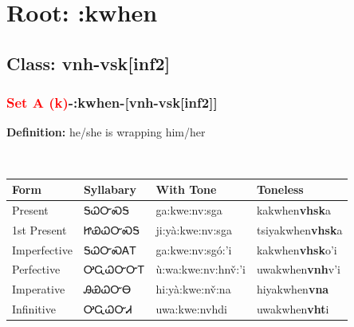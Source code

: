 \needspace{4in}
\section*{Root: :kwhen}
\nopagebreak
{}
\needspace{3in}
\subsection*{Class: vnh-vsk[inf2]}
\nopagebreak
\needspace{2in}
\subsubsection*{\textcolor{Red}{Set A (k)}{-}\textbf{:kwhen}{-}[vnh-vsk[inf2]]}
\nopagebreak
\textbf{Definition: } he/she is wrapping him/her
\\[0.5em]
\begin{tabularx}{\textwidth}{l X X X}%
\toprule%
\textbf{Form}&\textbf{Syllabary}&\textbf{With Tone}&\textbf{Toneless}\\%
\midrule%
Present&ᎦᏇᏅᏍᎦ&ga:kwe:nv:sga&kakwhen\textbf{vhsk}a\\%
1st Present&ᏥᏯᏇᏅᏍᎦ&ji:yà:kwe:nv:sga&tsiyakwhen\textbf{vhsk}a\\%
Imperfective&ᎦᏇᏅᏍᎪᎢ&ga:kwe:nv:sgó:’i&kakwhen\textbf{vhsk}o'i\\%
Perfective&ᎤᏩᏇᏅᏅᎢ&ù:wa:kwe:nv:hnv̌:’i&uwakwhen\textbf{vnh}v'i\\%
Imperative&ᎯᏯᏇᏅᎾ&hi:yà:kwe:nv̌:na&hiyakwhen\textbf{vna}\\%
Infinitive&ᎤᏩᏇᏅᏗ&uwa:kwe:nvhdi&uwakwhen\textbf{vht}i\\%
\bottomrule%
\end{tabularx}
\\[1em]
